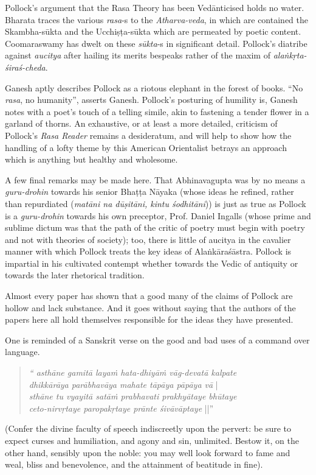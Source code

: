 Pollock’s argument that the Rasa Theory has been Vedānticised holds no water. Bharata traces the various \textsl{rasa}-s to the \textsl{Atharva-veda}, in which are contained the Skambha-sūkta and the Ucchiṣṭa-sūkta which are permeated by poetic content. Coomaraswamy has dwelt on these \textsl{sūkta}-s in significant detail. Pollock’s diatribe against \textsl{aucitya} after hailing its merits bespeaks rather of the maxim of \textsl{alaṅkṛta-śiraś-cheda}.

Ganesh aptly describes Pollock as a riotous elephant in the forest of books. “No \textsl{rasa}, no humanity”, asserts Ganesh. Pollock's posturing of humility is, Ganesh notes with a poet's touch of a telling simile, akin to fastening a tender flower in a garland of thorns. An exhaustive, or at least a more detailed, criticism of Pollock’s \textsl{Rasa Reader} remains a desideratum, and will help to show how the handling of a lofty theme by this American Orientalist betrays an approach which is anything but healthy and wholesome.

A few final remarks may be made here. That Abhinavagupta was by no means a \textsl{guru-drohin} towards his senior Bhaṭṭa Nāyaka (whose ideas he refined, rather than repurdiated (\textsl{matāni na dūṣitāni, kintu śodhitāni})) is just as true as Pollock is a \textsl{guru-drohin} towards his own preceptor, Prof. Daniel Ingalls (whose prime and sublime dictum was that the path of the critic of poetry must begin with poetry and not with theories of society); too, there is little of aucitya in the cavalier manner with which Pollock treats the key ideas of Alaṅkāraśāstra. Pollock is impartial in his cultivated contempt whether towards the Vedic of antiquity or towards the later rhetorical tradition.

Almost every paper has shown that a good many of the claims of Pollock are hollow and lack substance. And it goes without saying that the authors of the papers here all hold themselves responsible for the ideas they have presented.

One is reminded of a Sanskrit verse on the good and bad uses of a command over language.
\begin{quote}
\textsl{“ asthāne gamitā layaṁ hata-dhiyāṁ vāg-devatā kalpate}\\
\textsl{\qquad      dhikkārāya parābhavāya mahate tāpāya pāpāya vā} |\\
\textsl{sthāne tu vyayitā satāṁ prabhavati prakhyātaye bhūtaye}\\
\textsl{\qquad      ceto-nirvṛtaye paropakṛtaye prānte śivāvāptaye} ||”
\end{quote}
(Confer the divine faculty of speech indiscreetly upon the pervert: be sure to expect curses and humiliation, and agony and sin, unlimited. Bestow it, on the other hand, sensibly upon the noble: you may well look forward to fame and weal, bliss and benevolence, and the attainment of beatitude in fine).

